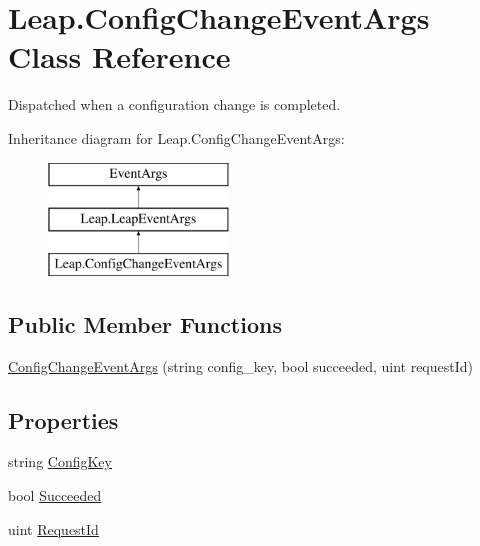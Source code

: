 \hypertarget{class_leap_1_1_config_change_event_args}{}\section{Leap.\+Config\+Change\+Event\+Args Class Reference}
\label{class_leap_1_1_config_change_event_args}


Dispatched when a configuration change is completed.  


Inheritance diagram for Leap.\+Config\+Change\+Event\+Args\+:\begin{figure}[H]
\begin{center}
\leavevmode
\includegraphics[height=3.000000cm]{class_leap_1_1_config_change_event_args}
\end{center}
\end{figure}
\subsection*{Public Member Functions}
\begin{DoxyCompactItemize}
\item 
\mbox{\hyperlink{class_leap_1_1_config_change_event_args_a209ff2d590318831b86f6b9276ed84a8}{Config\+Change\+Event\+Args}} (string config\+\_\+key, bool succeeded, uint request\+Id)
\end{DoxyCompactItemize}
\subsection*{Properties}
\begin{DoxyCompactItemize}
\item 
string \mbox{\hyperlink{class_leap_1_1_config_change_event_args_a9191ad7b7088320c72c544377f1f9cb8}{Config\+Key}}
\item 
bool \mbox{\hyperlink{class_leap_1_1_config_change_event_args_a2f9277cd05efe549b4da2d9f45afd7c9}{Succeeded}}
\item 
uint \mbox{\hyperlink{class_leap_1_1_config_change_event_args_aab8a8f32a9a3e45499f01d73855b2284}{Request\+Id}}
\end{DoxyCompactItemize}



